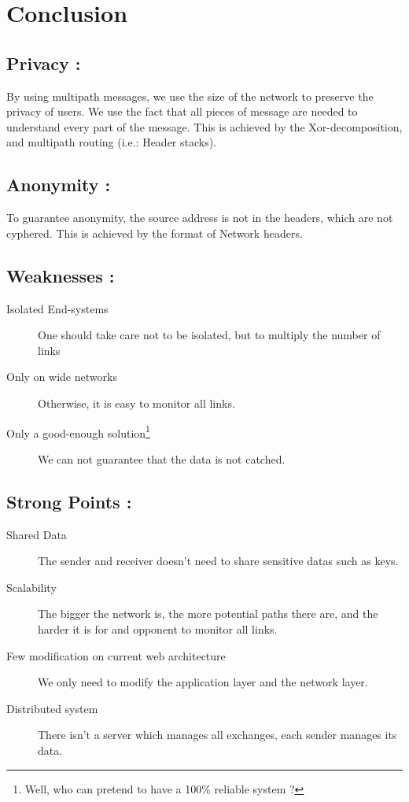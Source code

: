 \documentclass[a4paper, onecolumn, 10pt]{article}
\numberwithin{equation}{section}
\begin{document}
\section{Conclusion}
\subsection{Privacy :}
By using multipath messages, we use the size of the network to preserve the privacy of users. We use the fact that all pieces of message are needed to understand every part of the message. This is achieved by the Xor-decomposition, and multipath routing (i.e.: Header stacks).
\subsection{Anonymity :}
To guarantee anonymity, the source address is not in the headers, which are not cyphered. This is achieved by the format of Network headers.
\subsection{Weaknesses :}
\begin{description}
  \item[Isolated End-systems] One should take care not to be isolated, but to multiply the number of links
  \item[Only on wide networks] Otherwise, it is easy to monitor all links.
  \item[Only a good-enough solution\footnote{Well, who can pretend to have a 100\% reliable system ?}] We can not guarantee that the data is not catched.
\end{description}
\subsection{Strong Points :}
\begin{description}
  \item[Shared Data] The sender and receiver doesn't need to share sensitive datas such as keys. 
  \item[Scalability] The bigger the network is, the more potential paths there are, and the harder it is for and opponent to monitor all links.
  \item[Few modification on current web architecture] We only need to modify the application layer and the network layer.
  \item[Distributed system] There isn't a server which manages all exchanges, each sender manages its data.
\end{description}
\end{document}
